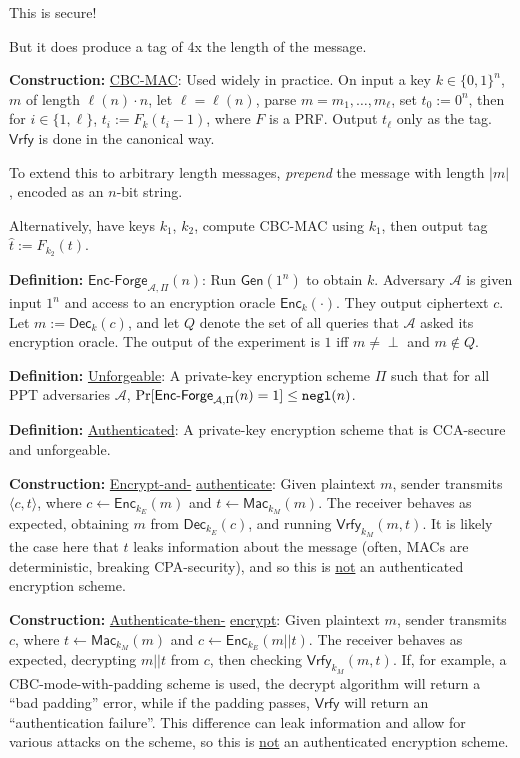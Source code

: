 \documentclass[10pt]{article}
\newcommand{\AAA}{\mathcal{A}}
\newcommand{\defn}[1]{{\bf Definition:} \underline{#1}}
\newcommand{\con}[1]{{\bf Construction:} \underline{#1}}
\newcommand{\Enc}{\mathsf{Enc}}
\newcommand{\Dec}{\mathsf{Dec}}
\newcommand{\Mac}{\mathsf{Mac}}
\newcommand{\Vrfy}{\mathsf{Vrfy}}
\newcommand{\Gen}{\mathsf{Gen}}
\newcommand{\ang}[1]{\langle#1\rangle}
\newcommand{\ExptEncfArgs}[2]{\mathsf{Enc\text{-}Forge}_{#1,#2}}
\newcommand{\ExptEncf}{\ExptEncfArgs{\AAA}{\Pi}}
\newcommand{\negl}{{\tt negl}}
\newcommand{\from}{\leftarrow}
\begin{document}
\begin{multicols}{3}
This is secure!

But it does produce a tag of 4x the length of the message.

\con{CBC-MAC}: Used widely in practice. On input a key $k\in\{0,1\}^n$, $m$ of length $\ell(n)\cdot n$, let $\ell=\ell(n)$, parse $m=m_1,\dots,m_\ell$, set $t_0:=0^n$, then for $i\in\{1,\ell\}$, $t_i:=F_k(t_i-1)$, where $F$ is a PRF. Output $t_\ell$ only as the tag. $\Vrfy$ is done in the canonical way.

To extend this to arbitrary length messages, {\it prepend} the message with length $|m|$, encoded as an $n$-bit string.

Alternatively, have keys $k_1$, $k_2$, compute CBC-MAC using $k_1$, then output tag $\hat{t}:=F_{k_2}(t)$.

\defn{$\ExptEncf(n)$}: Run $\Gen(1^n)$ to obtain $k$. Adversary $\AAA$ is given input $1^n$ and access to an encryption oracle $\Enc_k(\cdot)$. They output ciphertext $c$. Let $m:=\Dec_k(c)$, and let $Q$ denote the set of all queries that $\AAA$ asked its encryption oracle. The output of the experiment is $1$ iff $m\neq\perp$ and $m\not\in Q$.

\defn{Unforgeable}: A private-key encryption scheme $\Pi$ such that for all PPT adversaries $\AAA$, $\Pr[\ExptEncf(n)=1]\leq\negl(n)$.

\defn{Authenticated}: A private-key encryption scheme that is CCA-secure and unforgeable.

\con{Encrypt-and-} \underline{authenticate}: Given plaintext $m$, sender transmits $\ang{c,t}$, where $c\from\Enc_{k_E}(m)$ and $t\from\Mac_{k_M}(m)$. The receiver behaves as expected, obtaining $m$ from $\Dec_{k_E}(c)$, and running $\Vrfy_{k_M}(m,t)$. It is likely the case here that $t$ leaks information about the message (often, MACs are deterministic, breaking CPA-security), and so this is \underline{not} an authenticated encryption scheme.

\con{Authenticate-then-} \underline{encrypt}: Given plaintext $m$, sender transmits $c$, where $t\from\Mac_{k_M}(m)$ and $c\from\Enc_{k_E}(m||t)$. The receiver behaves as expected, decrypting $m||t$ from $c$, then checking $\Vrfy_{k_M}(m,t)$. If, for example, a CBC-mode-with-padding scheme is used, the decrypt algorithm will return a ``bad padding'' error, while if the padding passes, $\Vrfy$ will return an ``authentication failure''. This difference can leak information and allow for various attacks on the scheme, so this is \underline{not} an authenticated encryption scheme.


\end{multicols}
\end{document}
